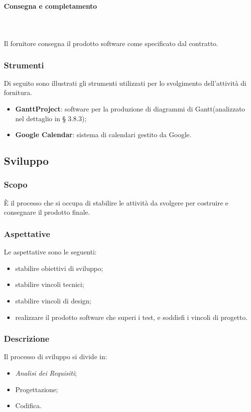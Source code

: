 			\paragraph{Consegna e completamento} \mbox{} \\ \mbox{} \\		
			Il fornitore consegna il prodotto software come specificato dal contratto.
		\subsubsection{Strumenti}
		Di seguito sono illustrati gli strumenti utilizzati per lo svolgimento dell'attività di fornitura.
		\begin{itemize}
			\item \textbf{GanttProject}: software per la produzione di diagrammi di Gantt\glo (analizzato nel dettaglio in § 3.8.3);
			\item \textbf{Google Calendar}: sistema di calendari gestito da Google.
		\end{itemize}

	\subsection{Sviluppo}
		\subsubsection{Scopo}È il processo che si occupa di stabilire le attività da svolgere per costruire e consegnare il prodotto finale.
		\subsubsection{Aspettative}
		Le aspettative sono le seguenti:
			\begin{itemize}
				\item stabilire obiettivi di sviluppo;
				\item stabilire vincoli tecnici;
				\item stabilire vincoli di design;
				\item realizzare il prodotto software che superi i test, e soddisfi i vincoli di progetto.
			\end{itemize}
		\subsubsection{Descrizione}
			Il processo di sviluppo si divide in:
				\begin{itemize}
					\item \textit{Analisi dei Requisiti};
					\item Progettazione;
					\item Codifica.
				\end{itemize}
